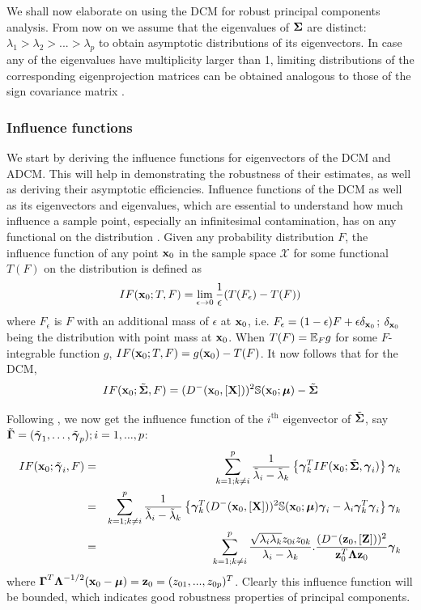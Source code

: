 We shall now elaborate on using the DCM for robust principal components analysis. From now on we assume that the eigenvalues of ${\boldsymbol{\Sigma}}$ are distinct: $\lambda_1 > \lambda_2 > ... > \lambda_p$ to obtain asymptotic distributions of its eigenvectors. In case any of the eigenvalues have multiplicity larger than 1, limiting distributions of the corresponding eigenprojection matrices can be obtained analogous to those of the sign covariance matrix \citep{magyar14}.

\subsubsection{Influence functions}
We start by deriving the influence functions for eigenvectors of the DCM and ADCM. This will help in demonstrating the robustness of their estimates, as well as deriving their asymptotic efficiencies. Influence functions of the DCM as well as its eigenvectors and eigenvalues, which are essential to understand how much influence a sample point, especially an infinitesimal contamination, has on any functional on the distribution \citep{HampelBook86}. Given any probability distribution $F$, the influence function of any point ${\bf{x}}_0$ in the sample space $\mathcal{X}$ for some functional $T(F)$ on the distribution is defined as
%
$$ IF({\bf{x}}_0; T,F) = \lim_{\epsilon \rightarrow 0} \frac{1}{\epsilon} (T(F_\epsilon) - T(F)) $$
%
where $F_\epsilon$ is $F$ with an additional mass of $\epsilon$ at ${\bf{x}}_0$, i.e. $F_\epsilon = (1-\epsilon)F + \epsilon \delta_{{\bf{x}}_0}$; $\delta_{{\bf{x}}_0}$ being the distribution with point mass at ${\bf{x}}_0$. When $T(F) = {\mathbb{E}}_F g$ for some $F$-integrable function $g$, $IF({\bf{x}}_0; T,F) = g({\bf{x}}_0) - T(F)$. It now follows that for the DCM,
%
$$ IF({\bf{x}}_0; \tilde {{\boldsymbol{\Sigma}}}, F) = ( D^- ( {\bf{x}}_0, [{\mathbf{X}}]))^2 {\mathbb{S}}({\bf{x}}_0; {\boldsymbol{\mu}}) - \tilde {{\boldsymbol{\Sigma}}} $$

Following \cite{croux00}, we now get the influence function of the $i^\text{th}$ eigenvector of $\tilde {{\boldsymbol{\Sigma}}}$, say $\tilde {{\boldsymbol{\Gamma}}} = (\tilde{{\boldsymbol{\gamma}}}_{1}, \ldots, \tilde {{\boldsymbol{\gamma}}}_{p}); i = 1,...,p$:
%
\begin{eqnarray}
IF({\bf{x}}_0; \tilde{{\boldsymbol{\gamma}}}_{i}, F) &=& \sum_{k=1; k \neq i}^p \frac{1}{\tilde\lambda_{i} - \tilde\lambda_{k}} \left\{ {\boldsymbol{\gamma}}^T_k IF({\bf{x}}_0; \tilde {{\boldsymbol{\Sigma}}}, {\boldsymbol{\gamma}}_i) \right\} {\boldsymbol{\gamma}}_k \notag \\
&=& \sum_{k=1; k \neq i}^p \frac{1}{\tilde \lambda_{i} - \tilde \lambda_{k}} \left\{ {\boldsymbol{\gamma}}^T_k ( D^-({\bf{x}}_0, [{\mathbf{X}}]))^2 {\mathbb{S}}({\bf{x}}_0; {\boldsymbol{\mu}}) {\boldsymbol{\gamma}}_i - \lambda_{i} {\boldsymbol{\gamma}}_k^T {\boldsymbol{\gamma}}_i \right\} {\boldsymbol{\gamma}}_k \notag \\
&=& \sum_{k=1; k \neq i}^p \frac{\sqrt{\lambda_i \lambda_k} z_{0i} z_{0k}}{ \lambda_{i} - \lambda_{k}}. \frac{ ( D^- ({\bf{z}}_0, [{\mathbf{Z}}]))^2 }{ {\bf{z}}_0^T {\boldsymbol{\Lambda}} {\bf{z}}_0} {\boldsymbol{\gamma}}_k
\end{eqnarray}
%
where ${\boldsymbol{\Gamma}}^T {\boldsymbol{\Lambda}}^{-1/2} ({\bf{x}}_0 - {\boldsymbol{\mu}}) = {\bf{z}}_0 = (z_{01},...,z_{0p})^T$. Clearly this influence function will be bounded, which indicates good robustness properties of principal components.

